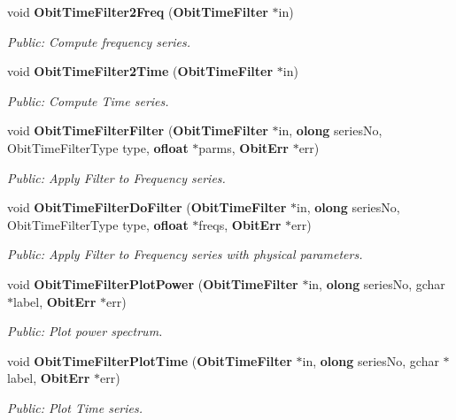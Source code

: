 \begin{CompactItemize}
void {\bf Obit\-Time\-Filter2Freq} ({\bf Obit\-Time\-Filter} $\ast$in)
\begin{CompactList}\small\item\em Public: Compute frequency series. \item\end{CompactList}\item 
void {\bf Obit\-Time\-Filter2Time} ({\bf Obit\-Time\-Filter} $\ast$in)
\begin{CompactList}\small\item\em Public: Compute Time series. \item\end{CompactList}\item 
void {\bf Obit\-Time\-Filter\-Filter} ({\bf Obit\-Time\-Filter} $\ast$in, {\bf olong} series\-No, Obit\-Time\-Filter\-Type type, {\bf ofloat} $\ast$parms, {\bf Obit\-Err} $\ast$err)
\begin{CompactList}\small\item\em Public: Apply Filter to Frequency series. \item\end{CompactList}\item 
void {\bf Obit\-Time\-Filter\-Do\-Filter} ({\bf Obit\-Time\-Filter} $\ast$in, {\bf olong} series\-No, Obit\-Time\-Filter\-Type type, {\bf ofloat} $\ast$freqs, {\bf Obit\-Err} $\ast$err)
\begin{CompactList}\small\item\em Public: Apply Filter to Frequency series with physical parameters. \item\end{CompactList}\item 
void {\bf Obit\-Time\-Filter\-Plot\-Power} ({\bf Obit\-Time\-Filter} $\ast$in, {\bf olong} series\-No, gchar $\ast$label, {\bf Obit\-Err} $\ast$err)
\begin{CompactList}\small\item\em Public: Plot power spectrum. \item\end{CompactList}\item 
void {\bf Obit\-Time\-Filter\-Plot\-Time} ({\bf Obit\-Time\-Filter} $\ast$in, {\bf olong} series\-No, gchar $\ast$label, {\bf Obit\-Err} $\ast$err)
\begin{CompactList}\small\item\em Public: Plot Time series. \item\end{CompactList}\end{CompactItemize}


